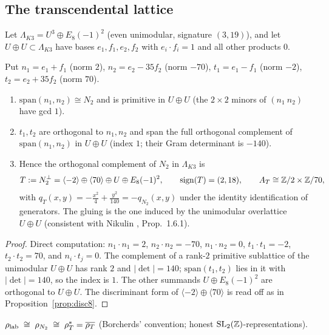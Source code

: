 \subsection{The transcendental lattice}\label{sec:T}
Let $\Lambda_{K3}=U^3\oplus E_8(-1)^2$ (even unimodular, signature $(3,19)$), and let $U\oplus U\subset\Lambda_{K3}$ have bases $e_1,f_1,e_2,f_2$ with $e_i\cdot f_i=1$ and all other products $0$.
\begin{proposition}\label{prop:T8}
Put $n_1=e_1+f_1$ (norm $2$), $n_2=e_2-35f_2$ (norm $-70$), $t_1=e_1-f_1$ (norm $-2$), $t_2=e_2+35f_2$ (norm $70$).
\begin{enumerate}[label=(\roman*)]
\item $\mathrm{span}(n_1,n_2)\cong N_2$ and is primitive in $U\oplus U$ (the $2\times2$ minors of $(n_1\ n_2)$ have gcd $1$).
\item $t_1,t_2$ are orthogonal to $n_1,n_2$ and span the full orthogonal complement of $\mathrm{span}(n_1,n_2)$ in $U\oplus U$ (index $1$; their Gram determinant is $-140$).
\item Hence the orthogonal complement of $N_2$ in $\Lambda_{K3}$ is
\[
T:=N_2^\perp=\langle-2\rangle\oplus\langle70\rangle\oplus U\oplus E_8(-1)^2,\qquad\mathrm{sign}(T)=(2,18),\qquad A_T\cong\mathbb{Z}/2\times\mathbb{Z}/70,
\]
with $q_T(x,y)=-\tfrac{x^2}4+\tfrac{y^2}{140}=-q_{N_2}(x,y)$ under the identity identification of generators. The gluing is the one induced by the unimodular overlattice $U\oplus U$ (consistent with Nikulin \cite{Nikulin}, Prop.~1.6.1).
\end{enumerate}
\end{proposition}
\begin{proof}
Direct computation: $n_1\cdot n_1=2$, $n_2\cdot n_2=-70$, $n_1\cdot n_2=0$, $t_1\cdot t_1=-2$, $t_2\cdot t_2=70$, and $n_i\cdot t_j=0$. The complement of a rank-$2$ primitive sublattice of the unimodular $U\oplus U$ has rank $2$ and $|\det|=140$; $\mathrm{span}(t_1,t_2)$ lies in it with $|\det|=140$, so the index is $1$. The other summands $U\oplus E_8(-1)^2$ are orthogonal to $U\oplus U$. The discriminant form of $\langle-2\rangle\oplus\langle70\rangle$ is read off as in Proposition~\ref{prop:disc8}.
\end{proof}
\begin{corollary}\label{cor:T8}
$\rho_{\rm lab}\;\cong\;\rho_{N_2}\;\cong\;\rho_T^*=\overline{\rho_T}$ (Borcherds' convention; honest $\mathrm{SL}_2(\mathbb{Z})$-representations).
\end{corollary}
